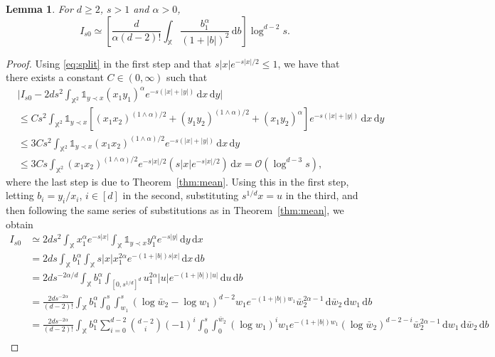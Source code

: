 \documentclass[11pt,reqno]{amsart}
\numberwithin{equation}{section}
\newtheorem{lemma}[theorem]{Lemma}
\theoremstyle{definition}
\newcommand{\XX}{\mathbb{X}}
\newcommand{\diff}{{\,\mathrm d}}
\begin{document}
\begin{lemma}\label{lem:Is0}
	For $d \ge 2$, $s>1$ and $\alpha>0$, 
	$$
	I_{s0}\simeq \left[\frac{d}{\alpha(d-2)!} \int_{\XX } \frac{b_1^\alpha }{(1+|b|)^{2}} \diff b\right] \log^{d-2} s.
	$$
\end{lemma}
\begin{proof}
	Using \eqref{eq:split} in the first step and that $s|x|e^{-s|x|/2} \le 1$, we have that there exists a constant $C \in (0,\infty)$ such that
		\begin{align*}
			&\Big| I_{s0}- 2d s^2 \int_{\XX^2} \mathds{1}_{y \prec x} (x_1 y_1)^{\alpha} e^{-s(|x|+|y|)}  \diff x \diff y \Big| \\
			&\le C s^2 \int_{\XX^2}\mathds{1}_{y \prec x} \left[(x_1 x_2)^{(1 \wedge \alpha)/2} + (y_1 y_2)^{(1 \wedge \alpha)/2} +(x_1 y_2)^{\alpha}\right] e^{-s(|x|+|y|)} \diff x \diff y\\
			& \le 3C s^2 \int_{\XX^2}\mathds{1}_{y \prec x} (x_1 x_2)^{(1 \wedge \alpha)/2} e^{-s(|x|+|y|)} \diff x \diff y\\
			&\le 3 C s \int_{\XX^2}(x_1 x_2)^{(1 \wedge \alpha)/2} e^{-s|x|/2} (s|x|e^{-s|x|/2}) \diff x =\mathcal{O}(\log^{d-3} s),
		\end{align*}
		where the last step is due to Theorem~\ref{thm:mean}. Using this in the first step, letting $b_i=y_i/x_i$, $i \in [d]$ in the second, substituting $s^{1/d}x=u$ in the third, and then following the same series of substitutions as in Theorem~\ref{thm:mean}, we obtain
		\begin{align}\label{eq:Is0}
			I_{s0} &\simeq 2d s^2 \int_{\XX} x_1^{\alpha} e^{-s|x|} \int_{\XX } \mathds{1}_{y \prec x} y_1^{\alpha} e^{-s|y|}  \diff y \diff x\nonumber\\
			&=2d s \int_{\XX } b_1^\alpha \int_{\XX}  s|x| x_1^{2\alpha} e^{-(1+|b|)s|x|}  \diff x \diff b\nonumber\\
			&=2d s^{-2\alpha/d}\int_{\XX } b_1^\alpha \int_{[0, s^{1/d}]^d} u_1^{2\alpha} |u| e^{-(1+|b|)|u|} \diff u \diff b\nonumber\\
			&=\frac{2d s^{-2\alpha}}{(d-2)!} \int_{\XX }b_1^\alpha  \int_0^s \int_{w_1}^{s} \left(\log \bar w_2 - \log w_1 \right)^{d-2}w_1  e^{-(1+|b|)w_1} \bar w_2^{2\alpha-1} \diff \bar w_2 \diff w_1 \diff b\nonumber\\
			&=\frac{2d s^{-2\alpha}}{(d-2)!} \int_{\XX } b_1^\alpha \sum_{i=0}^{d-2} \binom{d-2}{i} (-1)^i  \int_0^s \int_{0}^{\bar w_2} (\log w_1)^i w_1  e^{-(1+|b|)w_1} (\log \bar w_2)^{d-2-i}  \bar w_2^{2\alpha-1}  \diff w_1 \diff \bar w_2  \diff b\nonumber\\

\end{align}
\end{proof}
\end{document}
